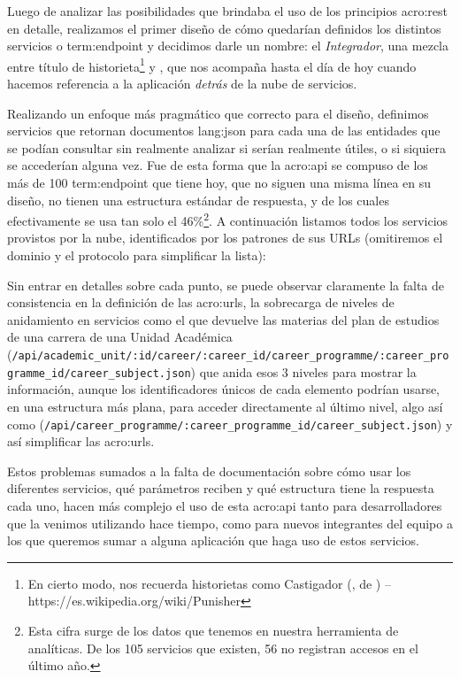 Luego de analizar las posibilidades que brindaba el uso de los principios \gls{acro:rest} en detalle, realizamos el primer diseño de cómo quedarían definidos los distintos servicios o \gls{term:endpoint} y decidimos darle un nombre: el \textit{Integrador}, una mezcla entre título de historieta\footnote{En cierto modo, nos recuerda historietas como Castigador (, de ) – https://es.wikipedia.org/wiki/Punisher} y , que nos acompaña hasta el día de hoy cuando hacemos referencia a la aplicación \textit{detrás} de la nube de servicios.

Realizando un enfoque más pragmático que correcto para el diseño, definimos servicios que retornan documentos \gls{lang:json} para cada una de las entidades que se podían consultar sin realmente analizar si serían realmente útiles, o si siquiera se accederían alguna vez. Fue de esta forma que la \gls{acro:api} se compuso de los más de 100 \gls{term:endpoint} que tiene hoy, que no siguen una misma línea en su diseño,  no tienen una estructura estándar de respuesta, y de los cuales efectivamente se usa tan solo el 46\%\footnote{Esta cifra surge de los datos que tenemos en nuestra herramienta de analíticas. De los 105 servicios que existen, 56 no registran accesos en el último año.}. A continuación listamos todos los servicios provistos por la nube, identificados por los patrones de sus URLs (omitiremos el dominio y el protocolo para simplificar la lista):



Sin entrar en detalles sobre cada punto, se puede observar claramente la falta de consistencia en la definición de las \glspl{acro:url}, la sobrecarga de niveles de anidamiento en servicios como el que devuelve las materias del plan de estudios de una carrera de una Unidad Académica (\lstinline$/api/academic_unit/:id/career/:career_id/career_programme/:career_programme_id/career_subject.json$) que anida esos 3 niveles para mostrar la información, aunque los identificadores únicos de cada elemento podrían usarse, en una estructura más plana, para acceder directamente al último nivel, algo así como (\lstinline$/api/career_programme/:career_programme_id/career_subject.json$) y así simplificar las \glspl{acro:url}.

Estos problemas sumados a la falta de documentación sobre cómo usar los diferentes servicios, qué parámetros reciben y qué estructura tiene la respuesta cada uno, hacen más complejo el uso de esta \gls{acro:api} tanto para desarrolladores que la venimos utilizando hace tiempo, como para nuevos integrantes del equipo a los que queremos sumar a alguna aplicación que haga uso de estos servicios.

